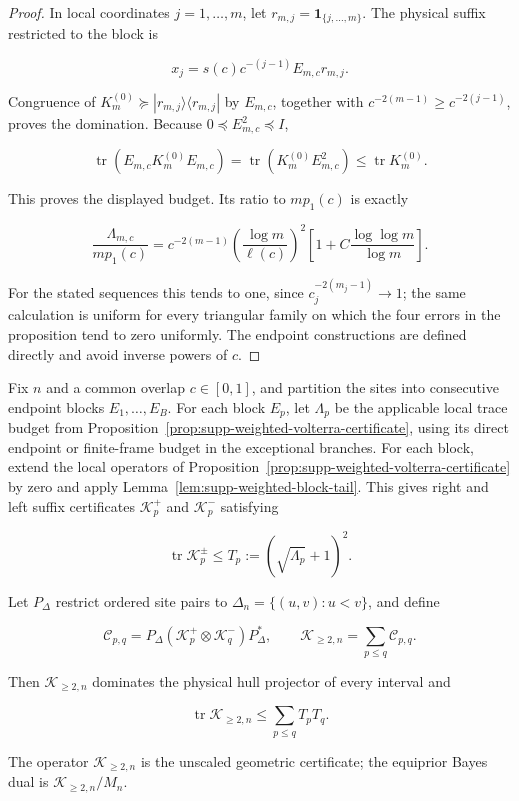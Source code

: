 \begin{proof}
In local coordinates \(j=1,\ldots,m\), let
\(r_{m,j}=\mathbf1_{\{j,\ldots,m\}}\). The physical suffix restricted to the
block is

\[
 x_j=s(c)c^{-(j-1)}E_{m,c}r_{m,j}.
\]

Congruence of
\(K_m^{(0)}\succeq|r_{m,j}\rangle\langle r_{m,j}|\) by \(E_{m,c}\),
together with
\(c^{-2(m-1)}\ge c^{-2(j-1)}\), proves the domination.  Because
\(0\preceq E_{m,c}^2\preceq I\),

\[
 \operatorname{tr}(E_{m,c}K_m^{(0)}E_{m,c})
 =\operatorname{tr}(K_m^{(0)}E_{m,c}^2)
 \le\operatorname{tr}K_m^{(0)}.
\]

This proves the displayed budget. Its ratio to \(mp_1(c)\) is exactly

\[
 \frac{\Lambda_{m,c}}{mp_1(c)}
 =c^{-2(m-1)}
 \left(\frac{\log m}{\ell(c)}\right)^2
 \left[1+C\frac{\log\log m}{\log m}\right].
\]

For the stated sequences this tends to one, since
\(c_j^{-2(m_j-1)}\to1\); the same calculation is uniform for every triangular
family on which the four errors in the proposition tend to zero uniformly.
The endpoint constructions are defined directly and avoid inverse powers of
\(c\).
\end{proof}

\begin{corollary}
\label{cor:supp-weighted-cell-certificate}
Fix \(n\) and a common overlap \(c\in[0,1]\), and partition the sites into
consecutive endpoint blocks \(E_1,\ldots,E_B\). For each block \(E_p\), let
\(\Lambda_p\) be the applicable local trace budget from
Proposition~\ref{prop:supp-weighted-volterra-certificate}, using its direct
endpoint or finite-frame budget in the exceptional branches.
For each block, extend the local operators of
Proposition~\ref{prop:supp-weighted-volterra-certificate} by zero and apply
Lemma~\ref{lem:supp-weighted-block-tail}.  This gives right and left suffix
certificates \(\mathcal K_p^+\) and \(\mathcal K_p^-\) satisfying

\[
 \operatorname{tr}\mathcal K_p^\pm
 \le T_p:=(\sqrt{\Lambda_p}+1)^2.
\]

Let \(P_\Delta\) restrict ordered site pairs to
\(\Delta_n=\{(u,v):u<v\}\), and define

\[
 \mathcal C_{p,q}
 =P_\Delta(\mathcal K_p^+\otimes\mathcal K_q^-)P_\Delta^*,
 \qquad
 \mathcal K_{\ge2,n}=\sum_{p\le q}\mathcal C_{p,q}.
\]

Then \(\mathcal K_{\ge2,n}\) dominates the physical hull projector of every
interval and

\[
 \operatorname{tr}\mathcal K_{\ge2,n}
 \le\sum_{p\le q}T_pT_q.
\]

The operator \(\mathcal K_{\ge2,n}\) is the unscaled geometric certificate;
the equiprior Bayes dual is
\(\mathcal K_{\ge2,n}/M_n\).
\end{corollary}

